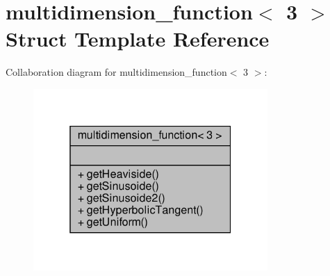 \hypertarget{structmultidimension__function_3_013_01_4}{}\section{multidimension\+\_\+function$<$ 3 $>$ Struct Template Reference}
\label{structmultidimension__function_3_013_01_4}


Collaboration diagram for multidimension\+\_\+function$<$ 3 $>$\+:\nopagebreak
\begin{figure}[H]
\begin{center}
\leavevmode
\includegraphics[width=253pt]{structmultidimension__function_3_013_01_4__coll__graph}
\end{center}
\end{figure}
